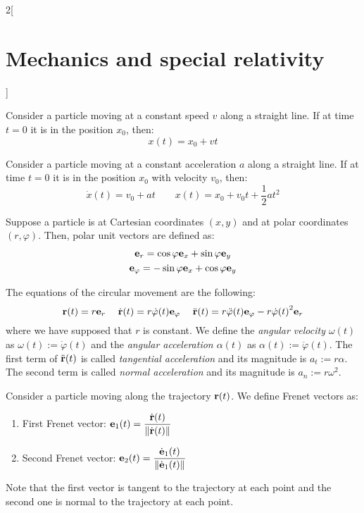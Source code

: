 \documentclass[../../../main.tex]{subfiles}
\begin{document}
\begin{multicols}{2}[\section{Mechanics and special relativity}]
\begin{definition}
  \end{definition}
  \begin{prop}
    Consider a particle moving at a constant speed $v$ along a straight line. If at time $t=0$ it is in the position $x_0$, then: $$x(t)=x_0+vt$$
  \end{prop}
  \begin{prop}
    Consider a particle moving at a constant acceleration $a$ along a straight line. If at time $t=0$ it is in the position $x_0$ with velocity $v_0$, then:
    $$\dot{x}(t)=v_0+at\qquad x(t)=x_0+v_0t+\frac{1}{2}at^2$$
  \end{prop}
  \begin{definition}
    Suppose a particle is at Cartesian coordinates $(x,y)$ and at polar coordinates $(r,\varphi)$. Then, polar unit vectors are defined as:
    \begin{gather*}
      \vb{e}_r=\cos\varphi\vb{e}_x+\sin\varphi\vb{e}_y\\
      \vb{e}_\varphi=-\sin\varphi\vb{e}_x+\cos\varphi\vb{e}_y
    \end{gather*}
  \end{definition}
  \begin{definition}
    The equations of the circular movement are the following: $$\vb{r}(t)=r\vb{e}_r\quad\;\dot{\vb{r}}(t)=r\dot{\varphi}(t)\vb{e}_\varphi\quad\;\ddot{\vb{r}}(t)=r\ddot{\varphi}(t)\vb{e}_\varphi-r{\dot{\varphi}(t)}^2\vb{e}_r$$ where we have supposed that $r$ is constant. We define the \textit{angular velocity $\omega(t)$} as $\omega(t):=\dot{\varphi}(t)$ and the \textit{angular acceleration $\alpha(t)$} as $\alpha(t):=\ddot{\varphi}(t)$. The first term of $\ddot{\vb{r}}(t)$ is called \textit{tangential acceleration} and its magnitude is $a_t:=r\alpha$. The second term is called \textit{normal acceleration} and its magnitude is $a_n:=r\omega^2$.
  \end{definition}
  \begin{definition}
    Consider a particle moving along the trajectory $\vb{r}(t)$. We define Frenet vectors as:
    \begin{enumerate}
      \item First Frenet vector: $\displaystyle\vb{e}_1(t)=\frac{\dot{\vb{r}}(t)}{\|\dot{\vb{r}}(t)\|}$
      \item Second Frenet vector: $\displaystyle\vb{e}_2(t)=\frac{\dot{\vb{e}}_1(t)}{\|\dot{\vb{e}}_1(t)\|}$
    \end{enumerate}
    Note that the first vector is tangent to the trajectory at each point and the second one is normal to the trajectory at each point.


\end{definition}
\end{multicols}
\end{document}
